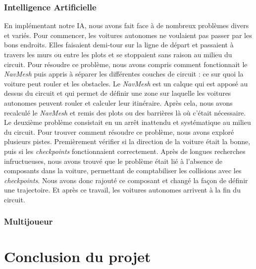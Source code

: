 \documentclass[a4paper,12pt]{article}
\newcommand{\AI}{Intelligence Artificielle}
\begin{document}
            \subsubsection{\AI}
                En implémentant notre IA, nous avons fait face à de nombreux problèmes divers et variés. Pour 
                commencer, les voitures autonomes ne voulaient pas passer par les bons endroits. Elles 
                faisaient demi-tour sur la ligne de départ et passaient à travers les murs ou entre les 
                plots et se stoppaient sans raison au milieu du circuit. Pour résoudre ce problème, nous
                avons compris comment fonctionnait le \textit{NavMesh} puis appris à séparer les 
                différentes couches de circuit : ce sur quoi la voiture peut rouler et les obstacles. Le 
                \textit{NavMesh} est un calque qui est apposé au dessus du circuit et qui permet de
                définir une zone sur laquelle les voitures autonomes peuvent rouler et calculer leur
                itinéraire. Après cela, nous avons recalculé le \textit{NavMesh} et remis des plots
                ou des barrières là où c'était nécessaire.\\
                Le deuxième problème consistait en un arrêt inattendu et systématique au milieu du 
                circuit. Pour trouver comment résoudre ce problème, nous avons exploré plusieurs pistes. Premièrement vérifier si la direction de la voiture était la bonne, puis si les 
                \textit{checkpoints} fonctionnaient correctement. Après de longues recherches 
                infructueuses, nous avons trouvé que le problème était lié à l'absence de composants 
                dans la voiture, permettant de comptabiliser les collisions avec les 
                \textit{checkpoints}. Nous avons donc rajouté ce composant et changé la façon de définir
                une trajectoire. Et après ce travail, les voitures autonomes arrivent à la fin du 
                circuit.

       
        
            \subsubsection{Multijoueur}
                 \lipsum[37-38]
        
        
    
    


    \section*{Conclusion du projet}
\end{document}
